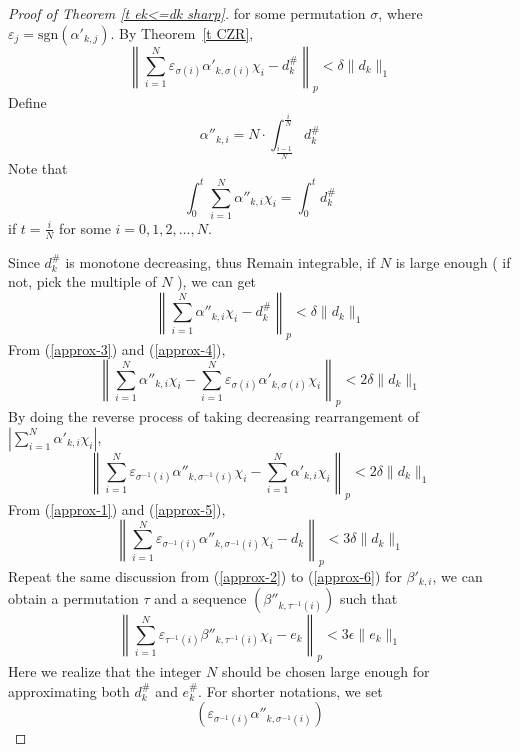 \documentclass[12pt]{amsart}
\begin{document}
\begin{proof}[Proof of Theorem \ref{t ek<=dk sharp}]
for some permutation $\sigma $,  where $\varepsilon
_j=\mbox{sgn}(\alpha '_{k,j})$. By Theorem~\ref{t CZR},
\begin{equation}
\label{approx-3}
\left\| \sum_{i=1}^N \varepsilon_{\sigma (i)}\alpha' _{k,\sigma
(i)}\chi _i-d^\#_k \right\|_p <
 \delta\|d_k\|_1
\end{equation}
Define
\begin{equation}
\alpha''_{k,i}=N \cdot \int_{\frac{i-1}{N}}^{\frac{i}{N}} d_k^\#
\end{equation}
Note that
\begin{equation}
\int_0^t \sum_{i=1}^N \alpha''_{k,i}\chi _i=\int_0^t d_k^\#
\end{equation}
if $t=\frac{i}{N}$ for some $i=0,1,2,...,N$.

Since $d_k^\#$ is monotone decreasing, thus Remain integrable, if
$N$ is large enough ( if not, pick the multiple of $N$ ), we can
get
\begin{equation}
\label{approx-4}
\left\|\sum_{i=1}^N \alpha''_{k,i}\chi_i -d^\#_k \right\|_p <
\delta\|d_k\|_1
\end{equation}
From (\ref{approx-3}) and (\ref{approx-4}),
\begin{equation}
\left\|\sum_{i=1}^N \alpha''_{k,i}\chi_i- \sum_{i=1}^N
\varepsilon_{\sigma (i)}\alpha' _{k,\sigma (i)}\chi _i \right\|_p
< 2\delta\|d_k\|_1
\end{equation}
By doing the reverse process of taking decreasing rearrangement of
$|\sum_{i=1}^N \alpha' _{k,i}\chi _i|$,
\begin{equation}
\label{approx-5}
\left\|\sum_{i=1}^N \varepsilon_{\sigma^{-1}(i)}\alpha''_{k,\sigma
^{-1}(i)}\chi_i- \sum_{i=1}^N \alpha' _{k,i}\chi _i \right\|_p <
2\delta\|d_k\|_1
\end{equation}
From (\ref{approx-1}) and (\ref{approx-5}),
\begin{equation}
\label{approx-6}
\left\|\sum_{i=1}^N \varepsilon_{\sigma^{-1}(i)}\alpha''_{k,\sigma
^{-1}(i)}\chi_i-d_k \right\|_p < 3\delta\|d_k\|_1
\end{equation}
Repeat the same discussion from (\ref{approx-2}) to (\ref{approx-6}) 
for $\beta'_{k,i}$, we
can obtain a permutation $\tau $ and a sequence $(\beta
''_{k,\tau^{-1}(i)})$ such that
\[\left\|\sum_{i=1}^N \varepsilon_{\tau^{-1}(i)}\beta''_{k,\tau ^{-1}(i)}\chi_i-e_k \right\|_p <
3\epsilon \|e_k\|_1\] Here we realize that the integer $N$ should
be chosen large enough for approximating both $d^\#_k$ and
$e^\#_k$. For shorter notations, we set
\[\left(\varepsilon_{\sigma^{-1}(i)}\alpha''_{k,\sigma^{-1}(i)}\right)
\]
\end{proof}
\end{document}
